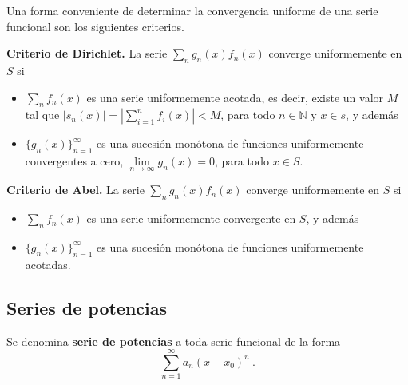 Una forma conveniente de determinar la convergencia uniforme de una serie funcional son los siguientes criterios.
\begin{teorema}{\textbf{Criterio de Dirichlet.}}
    La serie $\sum\limits_n g_n(x)f_n(x)$ converge uniformemente en $S$ si 
    \begin{itemize}
        \item $\sum\limits_n f_n(x)$ es una serie uniformemente acotada, es decir, existe un valor $M$ tal que $|s_n(x)| = \left| \sum\limits_{i=1}^n f_i(x)  \right| < M$, para todo $n \in \mathbb{N}$ y $x \in s$, y además 
        \item $\{ g_n(x) \}_{n=1}^\infty$ es una sucesión monótona de funciones uniformemente convergentes a cero, $\lim\limits_{n \to \infty} g_n(x) = 0 $, para todo $x \in S$.
    \end{itemize}
\end{teorema}

\begin{teorema}{\textbf{Criterio de Abel.}}
    La serie $\sum\limits_n g_n(x)f_n(x)$ converge uniformemente en $S$ si 
    \begin{itemize}
        \item $\sum\limits_n f_n(x)$ es una serie uniformemente convergente en $S$, y además 
        \item $\{ g_n(x) \}_{n=1}^\infty$ es una sucesión monótona de funciones uniformemente acotadas.
    \end{itemize}
\end{teorema}

\subsection{Series de potencias}

\begin{defi} 
    Se denomina \textbf{serie de potencias} a toda serie funcional de la forma 
    \begin{equation}
        \sum_{n=1}^\infty a_n (x-x_0)^n \ .
    \end{equation}
\end{defi}

